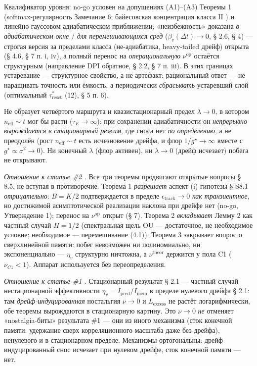 \documentclass[12pt]{iopart}
\begin{document}
Квалификатор уровня: no-go условен на допущениях (A1)--(A3) Теоремы 1 (softmax-регулярность \cite{Andriishin2026b} Замечание 6; байесовская концентрация класса II \cite{BialekNemenmanTishby2001}) и линейно-гауссовом адиабатическом приближении; «неизбежность» доказана \emph{в адиабатическом окне} / \emph{для перемешивающихся сред} (\(\beta_v(\Delta t)\to0\), § 2.6, § 4) --- строгая версия за пределами класса (не-адиабатика, heavy-tailed дрейф) открыта (§ 4.6, § 7 п. i, iv), а полный перенос на \emph{операциональную} \(\nu^{\text{op}}\) остаётся структурным (направление DPI обратное, § 2.2, § 7 п. iii). В этих границах устаревание --- структурное свойство, а не артефакт: рациональный ответ --- не наращивать точность или ёмкость, а периодически \emph{сбрасывать} устаревший слой (оптимальный \(\tau_{\text{reset}}^*\) \cite{Andriishin2026b} (12), § 5 п. 6).



Не образует четвёртого маршрута и квазистационарный предел \(\lambda \to 0\), в котором \(n_{\text{eff}} \sim t\) мог бы расти (\(\tau_E \to \infty\)): при сохранении адиабатичности он \emph{непрерывно вырождается в стационарный режим}, где сноса нет \emph{по определению}, а не преодолён (рост \(n_{\text{eff}} \sim t\) есть исчезновение дрейфа, и флор \(1/g^\star \to \infty\) вместе с \(g^\star \propto \sigma^2 \to 0\)). Ни конечный \(\lambda\) (флор активен), ни \(\lambda \to 0\) (дрейф исчезает) побега не открывают.



\emph{Отношение к статье \#2 \cite{Andriishin2026b}.} Все три теоремы продвигают открытые вопросы § 8.5, не вступая в противоречие. Теорема 1 \emph{разрешает} аспект (i) гипотезы § S8.1 \emph{отрицательно}: \(B = K/2\) подтверждается в пределе \(\epsilon_{\text{track}}\to 0\) \emph{как транзиентное}, но достижимой асимптотической реализации наклона при дрейфе нет (no-go, Утверждение 1); перенос на \(\nu^{\text{op}}\) открыт (§ 7). Теорема 2 \emph{вкладывает} Лемму 2 как частный случай \(H = 1/2\) (спектральная щель OU --- достаточное, не необходимое условие; необходимое --- перемешивание (4.1)). Теорема 3 закрывает вопрос о сверхлинейной памяти: побег невозможен ни полиномиально, ни экспоненциально --- \(\eta_v\) структурно ничтожна, а \(\nu^{\text{theor}}\) держится у пола C1 (\(\nu_{C1} < 1\)). Аппарат \cite{Andriishin2026b} используется без переопределения.



\emph{Отношение к статье \#1 \cite{Andriishin2026a}.} Стационарный результат \cite{Andriishin2026a} § 2.1 --- частный случай нестационарной эффективности \(\eta_v = I_{\text{pred}}/I_{\text{mem}}\) в пределе нулевого дрейфа \cite{Andriishin2026b} § 2.1: там \emph{дрейф-индуцированная} ностальгия \(\nu \to 0\) и \(L_{\text{excess}}\) не растёт логарифмически, обе теоремы вырождаются в стационарную картину. Это \(\nu \to 0\) \emph{не} отменяет «nostalgia-биты» результата \#1 --- они из иного механизма (сток конечной памяти: удержание сверх корреляционного масштаба даже без дрейфа), ненулевого и в стационарном пределе. Механизмы ортогональны: дрейф-индуцированный снос исчезает при нулевом дрейфе, сток конечной памяти --- нет.
\end{document}

